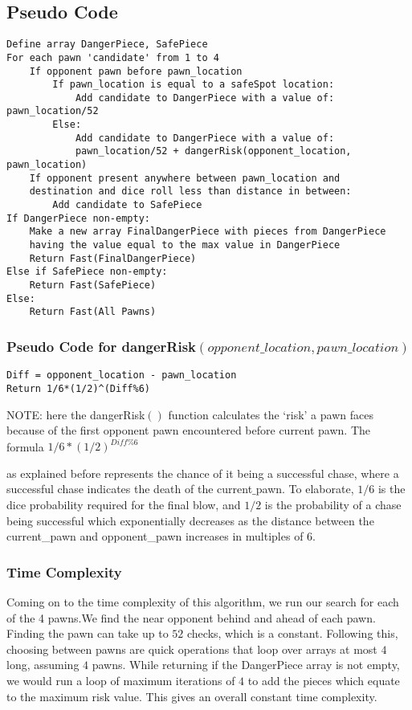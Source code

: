 \documentclass{article} %
\begin{document}
\subsection{Pseudo Code}
\begin{verbatim}
Define array DangerPiece, SafePiece
For each pawn 'candidate' from 1 to 4
    If opponent pawn before pawn_location
        If pawn_location is equal to a safeSpot location:
            Add candidate to DangerPiece with a value of: pawn_location/52
        Else:
            Add candidate to DangerPiece with a value of: 
            pawn_location/52 + dangerRisk(opponent_location, pawn_location)
    If opponent present anywhere between pawn_location and 
    destination and dice roll less than distance in between:
        Add candidate to SafePiece
If DangerPiece non-empty:
    Make a new array FinalDangerPiece with pieces from DangerPiece
    having the value equal to the max value in DangerPiece
    Return Fast(FinalDangerPiece)
Else if SafePiece non-empty:
    Return Fast(SafePiece)
Else:
    Return Fast(All Pawns)

\end{verbatim}

\subsubsection{Pseudo Code for dangerRisk$\left(opponent\_location, pawn\_location\right)$}
\begin{verbatim}
Diff = opponent_location - pawn_location
Return 1/6*(1/2)^(Diff%6) 
\end{verbatim}

NOTE: here the dangerRisk$()$ function calculates the ‘risk’ a pawn faces because of the first opponent pawn encountered before current pawn. The formula $1/6 * (1/2)^{Diff\% 6}$

as explained before represents the chance of it being a successful chase, where a successful chase indicates the death of the current$\_$pawn. To elaborate, $1/6$ is the dice probability required for the final blow, and $1/2$ is the probability of a chase being successful which exponentially decreases as the distance between the current\_pawn and opponent\_pawn increases in multiples of $6$.


\subsubsection{Time Complexity}
Coming on to the time complexity of this algorithm, we run our search for each of the 4 pawns.We find the near opponent behind and ahead of each pawn. Finding the pawn can take up to $52$ checks, which is a constant. Following this, choosing between pawns are quick operations that loop over arrays at most $4$ long, assuming $4$ pawns. While returning if the DangerPiece array is not empty, we would run a loop of maximum iterations of $4$ to add the pieces which equate to the maximum risk value. This gives an overall constant time complexity.
\end{document}
